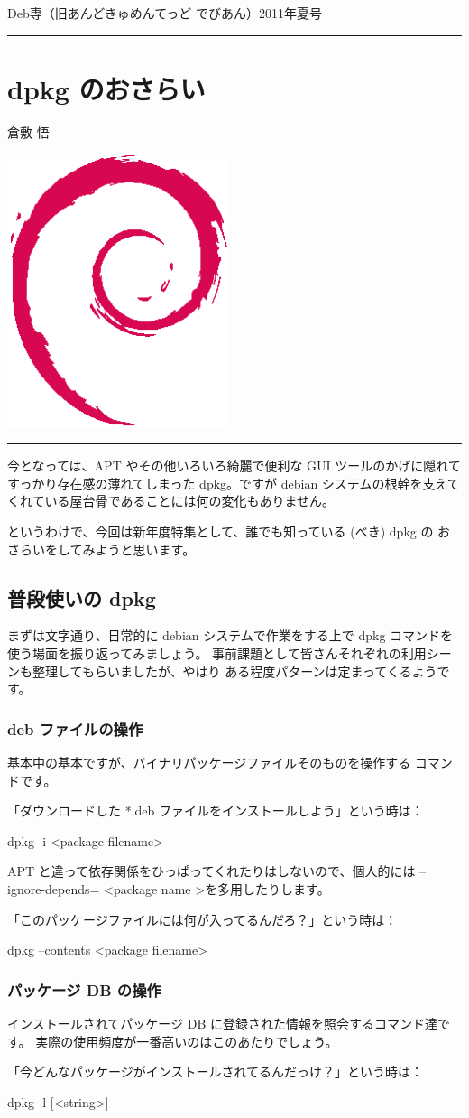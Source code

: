 \documentclass[mingoth,a4paper]{jsarticle}
\renewcommand{\dancersection}[2]{%
\newpage
Deb専（旧あんどきゅめんてっど でびあん）2011年夏号
%
\vspace{0.1mm}\\
{\color{dancerdarkblue}\rule{\hsize}{2mm}}

%
%
\begin{minipage}[t]{0.6\hsize}
\color{dancerdarkblue}
\vspace{1cm}
\section{#1}
\hfill{}#2\\
\end{minipage}
\begin{minipage}[t]{0.4\hsize}
\vspace{-2cm}
\hfill{}\includegraphics[height=8cm]{image200502/openlogo-nd.eps}\\
\vspace{-5cm}
\end{minipage}
%
{\color{dancerlightblue}\rule{0.66\hsize}{2mm}}
%
\vspace{2cm}
}
\begin{document}
\dancersection{dpkg のおさらい}{倉敷 悟}

今となっては、APT やその他いろいろ綺麗で便利な GUI ツールのかげに隠れて
すっかり存在感の薄れてしまった dpkg。ですが debian システムの根幹を支えて
くれている屋台骨であることには何の変化もありません。

というわけで、今回は新年度特集として、誰でも知っている (べき) dpkg の
おさらいをしてみようと思います。

\subsection{普段使いの dpkg}

まずは文字通り、日常的に debian システムで作業をする上で dpkg コマンドを
使う場面を振り返ってみましょう。
事前課題として皆さんそれぞれの利用シーンも整理してもらいましたが、やはり
ある程度パターンは定まってくるようです。

\subsubsection{deb ファイルの操作}

基本中の基本ですが、バイナリパッケージファイルそのものを操作する
コマンドです。

「ダウンロードした *.deb ファイルをインストールしよう」という時は：
\begin{commandline}
dpkg -i <package filename>
\end{commandline}

APT と違って依存関係をひっぱってくれたりはしないので、個人的には
--ignore-depends= \textless package name \textgreater を多用したりします。

「このパッケージファイルには何が入ってるんだろ？」という時は：
\begin{commandline}
dpkg --contents <package filename>
\end{commandline}

\subsubsection{パッケージ DB の操作}

インストールされてパッケージ DB に登録された情報を照会するコマンド達です。
実際の使用頻度が一番高いのはこのあたりでしょう。

「今どんなパッケージがインストールされてるんだっけ？」という時は：
\begin{commandline}
dpkg -l [<string>]
\end{commandline}
\end{document}
